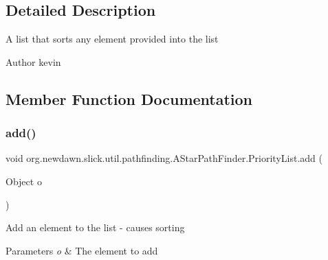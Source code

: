 \subsection{Detailed Description}
A list that sorts any element provided into the list

\begin{DoxyAuthor}{Author}
kevin 
\end{DoxyAuthor}


\subsection{Member Function Documentation}
\mbox{\label{classorg_1_1newdawn_1_1slick_1_1util_1_1pathfinding_1_1_a_star_path_finder_1_1_priority_list_a0515cf76de099aa00ffb61ef30fb6cb8}} 
\subsubsection{\texorpdfstring{add()}{add()}}
{\footnotesize\ttfamily void org.\+newdawn.\+slick.\+util.\+pathfinding.\+A\+Star\+Path\+Finder.\+Priority\+List.\+add (\begin{DoxyParamCaption}\item[{Object}]{o }\end{DoxyParamCaption})\hspace{0.3cm}{\ttfamily [inline]}}

Add an element to the list -\/ causes sorting


\begin{DoxyParams}{Parameters}
{\em o} & The element to add \\
\hline
\end{DoxyParams}

